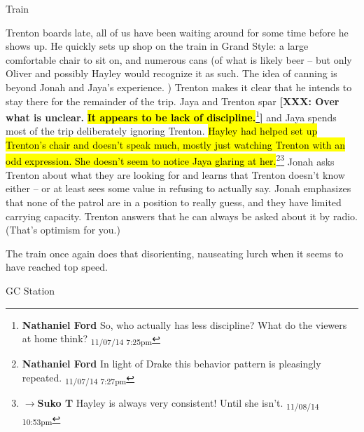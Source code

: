  {\LARGE Train } 



Trenton boards late, all of us have been waiting around for some time before he shows up.  He quickly sets up shop on the train in Grand Style: a large comfortable chair to sit on, and numerous cans (of what is likely beer – but only Oliver and possibly Hayley would recognize it as such.  The idea of canning is beyond Jonah and Jaya's experience. )  Trenton makes it clear that he intends to stay there for the remainder of the trip.  Jaya and Trenton spar \textbf{{[}XXX: Over what is unclear.  }\textbf{\hl{It appears to be lack of discipline.}}\footnote{\textbf{Nathaniel Ford }So, who actually has less discipline? What do the viewers at home think? \textsubscript{11/07/14 7:25pm}}\textbf{{]}} and Jaya spends most of the trip deliberately ignoring Trenton.  \hl{Hayley had helped set up Trenton's chair and doesn't speak much, mostly just watching Trenton with an odd expression.  She doesn't seem to notice Jaya glaring at her.}\footnote{\textbf{Nathaniel Ford }In light of Drake this behavior pattern is pleasingly repeated. \textsubscript{11/07/14 7:27pm}}\footnote{$\rightarrow$\textbf{Suko T }Hayley is always very consistent!  Until she isn't. \textsubscript{11/08/14 10:53pm}}  Jonah asks Trenton about what they are looking for and learns that Trenton doesn't know either – or at least sees some value in refusing to actually say.  Jonah emphasizes that none of the patrol are in a position to really guess, and they have limited carrying capacity.  Trenton answers that he can always be asked about it by radio.  (That's optimism for you.)



The train once again does that disorienting, nauseating lurch when it seems to have reached top speed.



 {\LARGE GC Station } 



